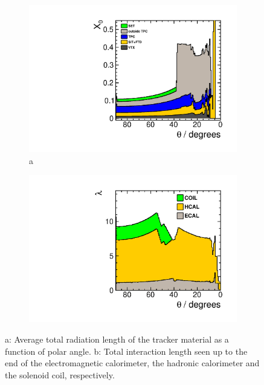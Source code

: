 \begin{figure}[th!]

\begin{subfigure}{0.45\textwidth}
\includegraphics[width=\textwidth]{Modelling/fig/ILD_l5_v02_matbudget_tracker_85deg.pdf} \caption{a}
\end{subfigure}
\begin{subfigure}{0.45\textwidth}
\includegraphics[width=\textwidth]{Modelling/fig/ILD_l5_v02_matbudget_calo_85deg.pdf}
\end{subfigure}
\caption[Material in the ILD detector]{a: Average total radiation length of the tracker material as a function of polar angle. b: Total interaction length seen up to the end of the electromagnetic calorimeter, the hadronic calorimeter and the solenoid coil, respectively.}
\label{fig:det:material}

\end{figure}

